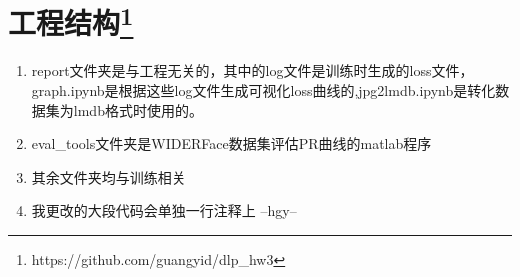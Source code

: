 \documentclass[10pt,a4paper]{article}%
\begin{document}
	\section[工程结构]{工程结构\footnote{https://github.com/guangyid/dlp\_hw3}}
	\begin{enumerate}
		\item 	report文件夹是与工程无关的，其中的log文件是训练时生成的loss文件，graph.ipynb是根据这些log文件生成可视化loss曲线的,jpg2lmdb.ipynb是转化数据集为lmdb格式时使用的。
		\item 	eval\_tools文件夹是WIDERFace数据集评估PR曲线的matlab程序
		\item 	其余文件夹均与训练相关
		\item 	我更改的大段代码会单独一行注释上 --hgy--
	\end{enumerate}



		
\end{document}
